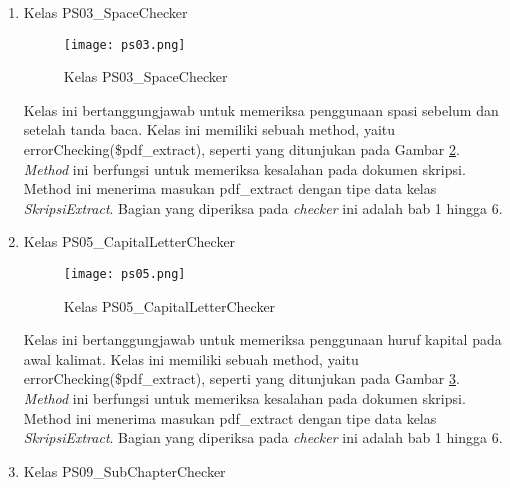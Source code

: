 \begin{enumerate}
	\begin{figure}[H]
	\centering	
	\texttt{[image: ps01.png]}
	\caption{Kelas PS01\_TypoChecker}	
	\label{fig:ps01} 
	\end{figure}
	
	Kelas ini bertanggungjawab untuk memeriksa kesalahan penulisan kata. Kelas ini memiliki sebuah method, yaitu errorChecking(\$pdf\_extract), seperti yang ditunjukan pada Gambar \ref{fig:ps01}. \textit{Method} ini berfungsi untuk memeriksa kesalahan pada dokumen skripsi. Method ini menerima masukan pdf\_extract dengan tipe data kelas \textit{SkripsiExtract}. Bagian yang diperiksa pada \textit{checker} ini adalah bab 1 hingga 6.
			
	\item Kelas PS03\_SpaceChecker \\
	
	\begin{figure}[H]
	\centering	
	\texttt{[image: ps03.png]}
	\caption{Kelas PS03\_SpaceChecker}	
	\label{fig:ps03} 
	\end{figure}	
		
	Kelas ini bertanggungjawab untuk memeriksa penggunaan spasi sebelum dan setelah tanda baca. Kelas ini memiliki sebuah method, yaitu errorChecking(\$pdf\_extract), seperti yang ditunjukan pada Gambar \ref{fig:ps03}. \textit{Method} ini berfungsi untuk memeriksa kesalahan pada dokumen skripsi. Method ini menerima masukan pdf\_extract dengan tipe data kelas \textit{SkripsiExtract}. Bagian yang diperiksa pada \textit{checker} ini adalah bab 1 hingga 6.
			
	\item Kelas PS05\_CapitalLetterChecker \\
	
	\begin{figure}[H]
	\centering	
	\texttt{[image: ps05.png]}
	\caption{Kelas PS05\_CapitalLetterChecker}	
	\label{fig:ps05} 
	\end{figure}
	
	Kelas ini bertanggungjawab untuk memeriksa penggunaan huruf kapital pada awal kalimat. Kelas ini memiliki sebuah method, yaitu errorChecking(\$pdf\_extract), seperti yang ditunjukan pada Gambar \ref{fig:ps05}. \textit{Method} ini berfungsi untuk memeriksa kesalahan pada dokumen skripsi. Method ini menerima masukan pdf\_extract dengan tipe data kelas \textit{SkripsiExtract}. Bagian yang diperiksa pada \textit{checker} ini adalah bab 1 hingga 6.
			
	\item Kelas PS09\_SubChapterChecker \\


\end{enumerate}
